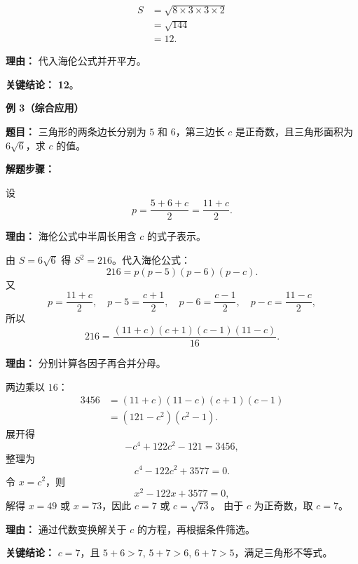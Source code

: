 \begin{examplebox}
\begin{description}[style=nextline, leftmargin=2.8em, labelsep=0.5em, itemsep=0.45em]
		\item[\textbf{第三步（代入公式）：}]
		      \[
			      \begin{aligned}
				      S
				       & = \sqrt{8\times3\times3\times2} \\
				       & = \sqrt{144}                    \\
				       & = 12.
			      \end{aligned}
		      \]
		      \par\textbf{理由：} 代入海伦公式并开平方。
	\end{description}

	\textbf{\textcolor{CExample}{关键结论：}} \textbf{12}。

	\medskip
	\textbf{\textcolor{CExample}{例 3（综合应用）}}

	\textbf{\textcolor{CExample}{题目：}} 三角形的两条边长分别为 $5$ 和 $6$，第三边长 $c$ 是正奇数，且三角形面积为 $6\sqrt{6}$，求 $c$ 的值。

	\textbf{\textcolor{CExample}{解题步骤：}}

	\begin{description}[style=nextline, leftmargin=2.8em, labelsep=0.5em, itemsep=0.45em]
		\item[\textbf{第一步（设半周长）：}]
		      设
		      \[
			      p = \dfrac{5+6+c}{2} = \dfrac{11+c}{2}.
		      \]
		      \par\textbf{理由：} 海伦公式中半周长用含 $c$ 的式子表示。

		\item[\textbf{第二步（代入面积平方）：}]
		      由 $S=6\sqrt{6}$ 得 $S^2 = 216$。代入海伦公式：
		      \[
			      216 = p(p-5)(p-6)(p-c).
		      \]
		      又
		      \[
			      p = \dfrac{11+c}{2},\quad
			      p-5 = \dfrac{c+1}{2},\quad
			      p-6 = \dfrac{c-1}{2},\quad
			      p-c = \dfrac{11-c}{2},
		      \]
		      所以
		      \[
			      216 = \dfrac{(11+c)(c+1)(c-1)(11-c)}{16}.
		      \]
		      \par\textbf{理由：} 分别计算各因子再合并分母。

		\item[\textbf{第三步（化简求解）：}]
		      两边乘以 $16$：
		      \[
			      \begin{aligned}
				      3456
				       & = (11+c)(11-c)(c+1)(c-1) \\
				       & = (121-c^2)(c^2-1).
			      \end{aligned}
		      \]
		      展开得
		      \[
			      -c^4 + 122c^2 - 121 = 3456,
		      \]
		      整理为
		      \[
			      c^4 - 122c^2 + 3577 = 0.
		      \]
		      令 $x=c^2$，则
		      \[
			      x^2 - 122x + 3577 = 0,
		      \]
		      解得 $x=49$ 或 $x=73$，因此 $c=7$ 或 $c=\sqrt{73}$。
		      由于 $c$ 为正奇数，取 $c=7$。
		      \par\textbf{理由：} 通过代数变换解关于 $c$ 的方程，再根据条件筛选。
	\end{description}

	\textbf{\textcolor{CExample}{关键结论：}} \textbf{$c=7$}，且 $5+6>7$, $5+7>6$, $6+7>5$，满足三角形不等式。
\end{examplebox}